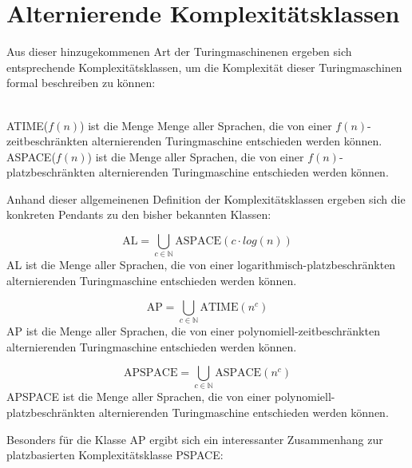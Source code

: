 \section{Alternierende Komplexitätsklassen} \label{section: Komplexitätsklassen bei alternierenden TMs}
Aus dieser hinzugekommenen Art der Turingmaschinenen ergeben sich entsprechende Komplexitätsklassen,
um die Komplexität dieser Turingmaschinen formal beschreiben zu können:
\begin{definition} \cite{sipser_introduction_2012}
    \\ATIME($f(n)$) ist die Menge Menge aller Sprachen, die von einer $f(n)$-zeitbeschränkten alternierenden Turingmaschine entschieden werden können. \\
    ASPACE($f(n)$) ist die Menge aller Sprachen, die von einer $f(n)$-platzbeschränkten alternierenden Turingmaschine entschieden werden können.
\end{definition}
Anhand dieser allgemeinenen Definition der Komplexitätsklassen ergeben sich die konkreten Pendants zu den bisher bekannten Klassen:

\begin{definition}\cite{sipser_introduction_2012}
    $$\text{AL} = \bigcup_{c \in \mathbb{N}} \text{ASPACE}(c \cdot log(n))$$
    AL ist die Menge aller Sprachen, die von einer logarithmisch-platzbeschränkten alternierenden Turingmaschine entschieden werden können.
\end{definition}

\begin{definition}\cite{arora_computational_2009}
    $$\text{AP} = \bigcup_{c \in \mathbb{N}} \text{ATIME}(n^c)$$
    AP ist die Menge aller Sprachen, die von einer polynomiell-zeitbeschränkten alternierenden Turingmaschine entschieden werden können.
\end{definition}

\begin{definition}\cite{sipser_introduction_2012}
    $$\text{APSPACE} = \bigcup_{c \in \mathbb{N}} \text{ASPACE}(n^c)$$
    APSPACE ist die Menge aller Sprachen, die von einer polynomiell-platzbeschränkten alternierenden Turingmaschine entschieden werden können. 
\end{definition}

Besonders für die Klasse AP ergibt sich ein interessanter Zusammenhang zur platzbasierten Komplexitätsklasse PSPACE:


